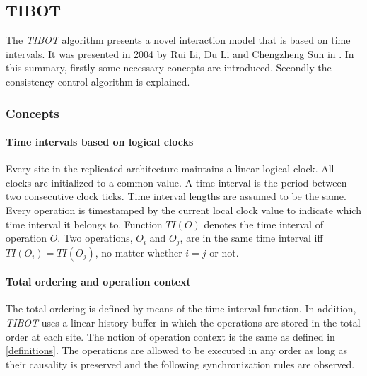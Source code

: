 \subsection{TIBOT}
\label{algo:tibot}

The \emph{TIBOT} algorithm presents a novel interaction model that is based on time intervals. It was presented in 2004 by Rui Li, Du Li and Chengzheng Sun in \cite{tibot}. In this summary, firstly some necessary concepts are introduced. Secondly the consistency control algorithm is explained.

\subsubsection{Concepts}
\paragraph{Time intervals based on logical clocks}
Every site in the replicated architecture maintains a linear logical clock. All clocks are initialized to a common value. A time interval is the period between two consecutive clock ticks. Time interval lengths are assumed to be the same. Every operation is timestamped by the current local clock value to indicate which time interval it belongs to. Function $TI(O)$ denotes the time interval of operation $O$. Two operations, $O_{i}$ and $O_{j}$, are in the same time interval iff $TI(O_{i}) = TI(O_{j})$, no matter whether $i = j$ or not.

\paragraph{Total ordering and operation context}
The total ordering is defined by means of the time interval function.  In addition, \emph{TIBOT} uses a linear history buffer in which the operations are stored in the total order at each site. The notion of operation context is the same as defined in \ref{definitions}. The operations are allowed to be executed in any order as long as their causality is preserved and the following synchronization rules are observed.

